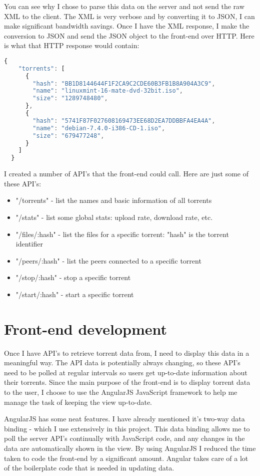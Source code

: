 You can see why I chose to parse this data on the server and not send the raw XML to the client. The XML is very verbose and by converting it to JSON, I can make significant bandwidth savings. Once I have the XML response, I make the conversion to JSON and send the JSON object to the front-end over HTTP. Here is what that HTTP response would contain:
\vspace{10px}
\begin{lstlisting}[caption=XML-RPC response converted to JSON, language=JavaScript]
  {
    "torrents": [
      {
        "hash": "BB1D8144644F1F2CA9C2CDE60B3FB1B8A904A3C9",
        "name": "linuxmint-16-mate-dvd-32bit.iso",
        "size": "1289748480",
      },
      {
        "hash": "5741F87F027608169473EE68D2EA7DDBBFA4EA4A",
        "name": "debian-7.4.0-i386-CD-1.iso",
        "size": "679477248",
      }
    ]
  }
\end{lstlisting}

I created a number of API's that the front-end could call. Here are just some of these API's:

\begin{itemize}
	\item "/torrents" - list the names and basic information of all torrents
	\item "/stats" - list some global stats: upload rate, download rate, etc.
	\item "/files/:hash" - list the files for a specific torrent: "hash" is the torrent identifier
	\item "/peers/:hash" - list the peers connected to a specific torrent
	\item "/stop/:hash" - stop a specific torrent
	\item "/start/:hash" - start a specific torrent
\end{itemize}


\section{Front-end development}
Once I have API's to retrieve torrent data from, I need to display this data in a meaningful way. The API data is potentially always changing, so these API's need to be polled at regular intervals so users get up-to-date information about their torrents. Since the main purpose of the front-end is to display torrent data to the user, I choose to use the AngularJS JavaScript framework to help me manage the task of keeping the view up-to-date. 

AngularJS has some neat features. I have already mentioned it's two-way data binding - which I use extensively in this project. This data binding allows me to poll the server API's continually with JavaScript code, and any changes in the data are automatically shown in the view. By using AngularJS I reduced the time taken to code the front-end by a significant amount. Angular takes care of a lot of the boilerplate code that is needed in updating data.

